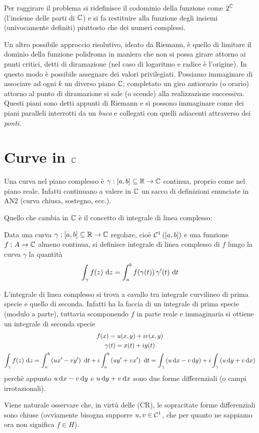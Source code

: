 Per raggirare il problema si ridefinisce il codominio della funzione come $2^{\mathbb{C}}$ (l'insieme delle parti di $\mathbb{C}$) e si fa restituire alla funzione degli insiemi (univocamente definiti) piuttosto che dei numeri complessi. 

Un altro possibile approccio risolutivo, ideato da Riemann, è quello di limitare il dominio della funzione polidroma in maniera che non si possa girare attorno ai punti critici, detti di diramazione (nel caso di logaritmo e radice è l'origine). In questo modo è possibile assegnare dei valori privilegiati. Possiamo immaginare di associare ad ogni $k$ un diverso piano $\mathbb{C}$; completato un giro antiorario (o orario) attorno al punto di diramazione si sale (o scende) alla realizzazione successiva. Questi piani sono detti appunti di Riemann e si possono immaginare come dei piani paralleli interrotti da un \textit{buco} e collegati con quelli adiacenti attraverso dei \textit{ponti}.



\section{Curve in \texorpdfstring{$\mathbb{C}$}{C}}

Una curva nel piano complesso è $\gamma: [a, b]\subseteq\mathbb{R}\rightarrow \mathbb{C}$ continua, proprio come nel piano reale. Infatti continuano a valere in $\mathbb{C}$ un sacco di definizioni enunciate in AN2 (curva chiusa, sostegno, ecc.).

Quello che cambia in $\mathbb{C}$ è il concetto di integrale di linea complesso:
\begin{defn}
Data una curva $\gamma: [a, b]\subseteq\mathbb{R}\rightarrow \mathbb{C}$ regolare, cioè $\mathcal{C}^1\left([a,b]\right)$ e una funzione $f:A\to\mathbb{C}$ almeno continua, si definisce integrale di linea complesso di $f$ lungo la curva $\gamma$ la quantità
\begin{equation*}
\int_{\gamma} f(z) \  \mathrm{d} z = \int^{b}_{a} f(\gamma (t))\, \gamma'(t) \  \mathrm{d} t
\end{equation*}
\end{defn}

\begin{rem}
L'integrale di linea complesso si trova a cavallo tra integrale curvilineo di prima specie e quello di seconda. Infatti ha la faccia di un integrale di prima specie (modulo a parte), tuttavia scomponendo $f$ in parte reale e immaginaria si ottiene un integrale di seconda specie
\begin{gather*}
f(x)=u(x,y)+iv(x,y) \\
\gamma(t)=x(t)+iy(t) \\ 
\int_\gamma f(z)\  \mathrm{d} z=\int_a^b \left(ux'-vy'\right)\  \mathrm{d} t+i\int_a^b\left(uy'+vx'\right) \  \mathrm{d} t = \int_\gamma\left(u\,\mathrm{d} x-v\,\mathrm{d} y\right) +i\int_\gamma\left(u\,\mathrm{d} y+v\,\mathrm{d} x\right)
\end{gather*}
perchè appunto $u\,\mathrm{d} x-v\,\mathrm{d} y$ e $u\,\mathrm{d} y+v\,\mathrm{d} x$ sono due forme differenziali (o campi irrotazionali).

Viene naturale osservare che, in virtù delle (CR), le sopracitate forme differenziali sono chiuse (ovviamente bisogna supporre $u,v\in\mathcal{C}^1$, che per quanto ne sappiamo ora non significa $f\in H$). 
\end{rem}

